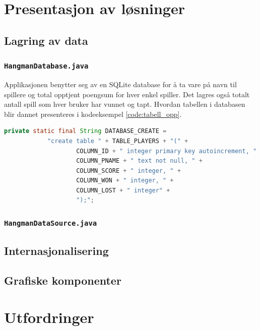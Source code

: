 \chapter{Presentasjon av løsninger}

\section{Lagring av data}
\subsection{\texttt{HangmanDatabase.java}}
Applikasjonen benytter seg av en SQLite database for å ta vare på navn til spillere og total opptjent poengsum for hver enkel spiller. Det lagres også totalt antall spill som hver bruker har vunnet og tapt. Hvordan tabellen i databasen blir dannet presenteres i kodeeksempel \ref{code:tabell_opp}.

\begin{lstlisting}[language=Java, caption=Script for opprettelse av tabell., label=code:tabell_opp]
 private static final String DATABASE_CREATE =
            "create table " + TABLE_PLAYERS + "(" +
                    COLUMN_ID + " integer primary key autoincrement, " +
                    COLUMN_PNAME + " text not null, " +
                    COLUMN_SCORE + " integer, " +
                    COLUMN_WON + " integer, " +
                    COLUMN_LOST + " integer" +
                    ");";
\end{lstlisting}


\subsection{\texttt{HangmanDataSource.java}}




\section{Internasjonalisering}
\section{Grafiske komponenter}


\chapter{Utfordringer}
